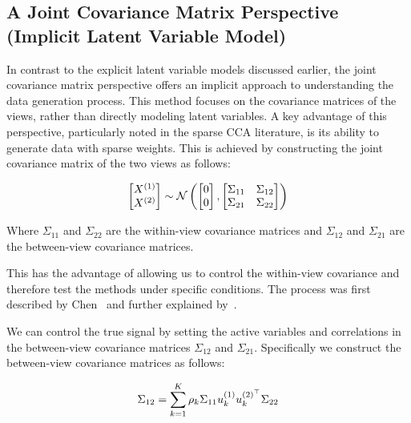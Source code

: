 \subsection{A Joint Covariance Matrix Perspective (Implicit Latent Variable Model)}\label{subsubsec:a-joint-covariance-matrix-perspective}

In contrast to the explicit latent variable models discussed earlier, the joint covariance matrix perspective offers an implicit approach to understanding the data generation process.
This method focuses on the covariance matrices of the views, rather than directly modeling latent variables.
A key advantage of this perspective, particularly noted in the sparse CCA literature, is its ability to generate data with sparse weights.
This is achieved by constructing the joint covariance matrix of the two views as follows:

\begin{align}\label{eq:covariance}
    \begin{bmatrix} X^{(1)} \\ X^{(2)} \end{bmatrix} \sim \mathcal{N} \left( \begin{bmatrix} 0 \\ 0 \end{bmatrix}, \begin{bmatrix} \Sigma_{11} & \Sigma_{12} \\ \Sigma_{21} & \Sigma_{22} \end{bmatrix} \right)
\end{align}

Where $\Sigma_{11}$ and $\Sigma_{22}$ are the within-view covariance matrices and $\Sigma_{12}$ and $\Sigma_{21}$ are the between-view covariance matrices.

This has the advantage of allowing us to control the within-view covariance and therefore test the methods under specific conditions.
The process was first described by Chen~\citep{chen2013sparse} and further explained by~\citep{suo2017sparse}.

We can control the true signal by setting the active variables and correlations in the between-view covariance matrices $\Sigma_{12}$ and $\Sigma_{21}$.
Specifically we construct the between-view covariance matrices as follows:

\begin{align}
    \Sigma_{12}=\sum_{k=1}^{K}\rho_k\Sigma_{11}u^{(1)}_{k}u^{(2)^{\top}}_k\Sigma_{22}
\end{align}

